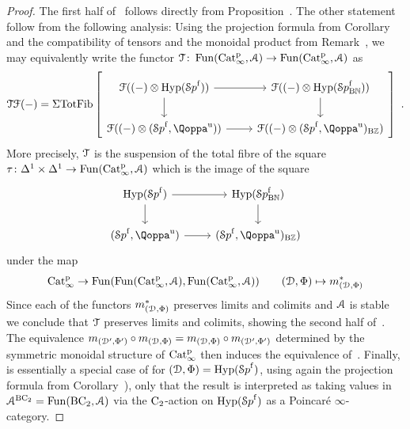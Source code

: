 \begin{proof}
The first half of~ follows directly from Proposition~. The other statement follow from the following analysis: 
Using the projection formula from Corollary~ and the compatibility of tensors and the monoidal product from Remark~, we may equivalently write the functor $\mathcal{T}\colon \operatorname{Fun}(\mathrm{Cat}^{\mathrm p}_\infty,\mathcal{A}) \to \operatorname{Fun}(\mathrm{Cat}^{\mathrm p}_\infty,\mathcal{A})$ as
\[
\T\F(-) = \Sig\TotFib\left[
\begin{tikzcd}
\F((-) \otimes \Hyp(\Spaf)) \ar[r]\ar[d] & \F((-) \otimes \Hyp(\Spaf_{\B\NN})) \ar[d] \\
\F((-) \otimes (\Spaf,\QF^{\uni})) \ar[r] & \F((-) \otimes (\Spaf,\QF^{\uni})_{\B\ZZ})
\end{tikzcd}\right] \ .
\]
More precisely, $\mathcal{T}$ is the suspension of the total fibre of the square $\tau\colon \Delta^1 \times \Delta^1 \to \operatorname{Fun}(\mathrm{Cat}^{\mathrm p}_\infty,\mathcal{A})$ which is the image of the square 
\[
\begin{tikzcd}
\Hyp(\Spaf) \ar[r]\ar[d] & \Hyp(\Spaf_{\B\NN}) \ar[d] \\
(\Spaf,\QF^{\uni}) \ar[r] & (\Spaf,\QF^{\uni})_{\B\ZZ})
\end{tikzcd}
\]
under the map
\[
\mathrm{Cat}^{\mathrm p}_\infty \to \operatorname{Fun}(\operatorname{Fun}(\mathrm{Cat}^{\mathrm p}_\infty,\mathcal{A}),\operatorname{Fun}(\mathrm{Cat}^{\mathrm p}_\infty,\mathcal{A})) \quad\quad (\mathcal{D},\Phi) \mapsto m_{(\mathcal{D},\Phi)}^*
\]
Since each of the functors $m_{(\mathcal{D},\Phi)}^*$ preserves limits and colimits and $\mathcal{A}$ is stable we conclude that $\mathcal{T}$ preserves limits and colimits, showing the second half of~. The equivalence $m_{(\mathcal{D}',{\Phi'})} \circ m_{(\mathcal{D},\Phi)} = m_{(\mathcal{D},\Phi)}\circ m_{(\mathcal{D}',{\Phi'})}$ determined by the symmetric monoidal structure of $\mathrm{Cat}^{\mathrm p}_\infty$ then induces the equivalence of~. Finally,  is essentially a special case of  for $(\mathcal{D},\Phi) = \operatorname{Hyp}({\mathcal Sp}^{\mathrm{f}})$, using again the projection formula from Corollary~), only that the result is interpreted as taking values in $\mathcal{A}^{\mathrm{B}\mathrm{C_2}}=\operatorname{Fun}(\mathrm{B}\mathrm{C_2},\mathcal{A})$ via the $\mathrm{C_2}$-action on $\operatorname{Hyp}({\mathcal Sp}^{\mathrm{f}})$ as a Poincaré $\infty$-category. 
\end{proof}



